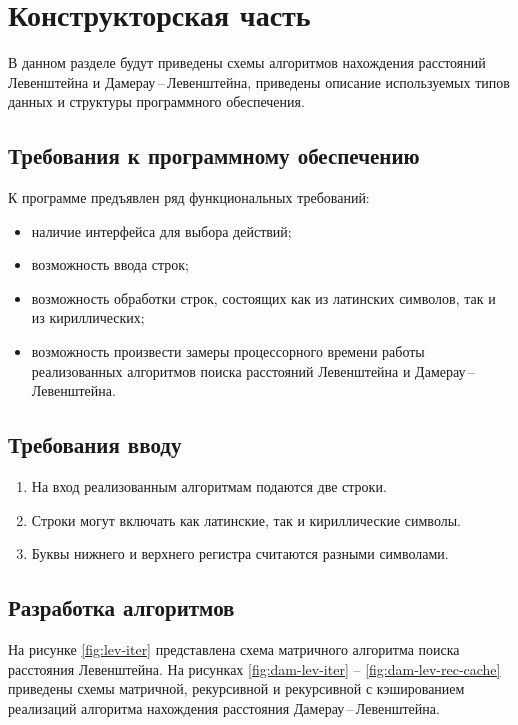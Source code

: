 \chapter{Конструкторская часть}

В данном разделе будут приведены схемы алгоритмов нахождения расстояний Левенштейна и Дамерау\,--\,Левенштейна, приведены описание используемых типов данных и структуры программного обеспечения.

\section{Требования к программному обеспе\-чению}

К программе предъявлен ряд функциональных требований:

\begin{itemize}
    \item наличие интерфейса для выбора действий;
    \item возможность ввода строк;
    \item возможность обработки строк, состоящих как из латинских символов, так и из кириллических;
    \item возможность произвести замеры процессорного времени работы ре\-ализованных алгоритмов поиска расстояний Левенштейна и Даме\-рау\,--\,Левенштейна.
\end{itemize}

\section{Требования вводу}

\begin{enumerate}
    \item На вход реализованным алгоритмам подаются две строки.
    \item Строки могут включать как латинские, так и кириллические сим\-волы.
    \item Буквы нижнего и верхнего регистра считаются разными символами.
\end{enumerate}

\section{Разработка алгоритмов}

На рисунке \ref{fig:lev-iter} представлена схема матричного алгоритма поиска расстояния Левенштейна.
На рисунках \ref{fig:dam-lev-iter} -- \ref{fig:dam-lev-rec-cache} приведены схемы матрич\-ной, рекурсивной и рекурсивной с кэшированием реализаций алгоритма нахож\-дения расстояния Дамерау\,--\,Левенштейна.

